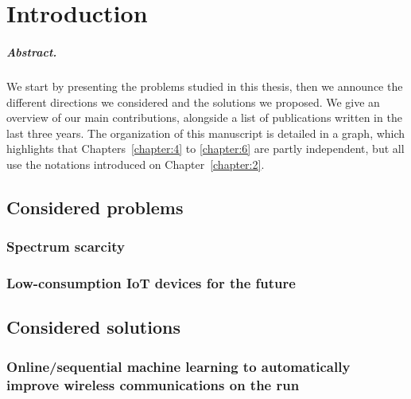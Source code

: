 
\chapter{Introduction}
\label{chapter:1}

\paragraph{Abstract.}
%
We start by presenting the problems studied in this thesis,
then we announce the different directions we considered and the solutions we proposed.
We give an overview of our main contributions, alongside a list of publications written in the last three years.
%
The organization of this manuscript is detailed in a graph, which highlights that Chapters~\ref{chapter:4} to \ref{chapter:6} are partly independent, but all use the notations introduced on Chapter~\ref{chapter:2}.

\minitoc

\newpage
\graphicspath{{2-Chapters/1-Chapter/Images/}}

\section{Considered problems}
\label{sec:1:problems}


\subsection{Spectrum scarcity}


\subsection{Low-consumption IoT devices for the future}


\section{Considered solutions}
\label{sec:1:solutions}



\subsection{Online/sequential machine learning to automatically improve wireless communications on the run}

